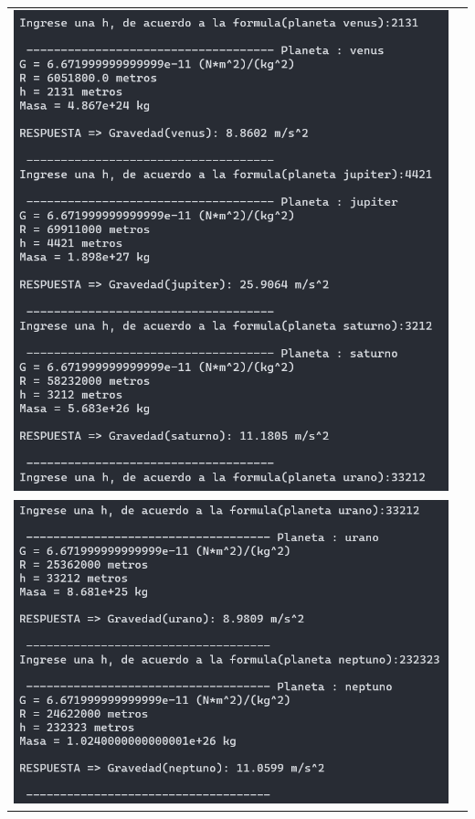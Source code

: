\documentclass[a4paper,12pt]{article}
\begin{document}
\begin{table}[!htbp]
\begin{tabular}{cc}
\begin{minipage}{.3\textwidth}
                    \includegraphics[width=\linewidth]{e1_2}
                \end{minipage}\\
                \begin{minipage}{.3\textwidth}
                    \includegraphics[width=\linewidth]{e1_3}
                \end{minipage}&\begin{minipage}{.3\textwidth}

\end{minipage}
\end{tabular}
\end{table}
\end{document}
